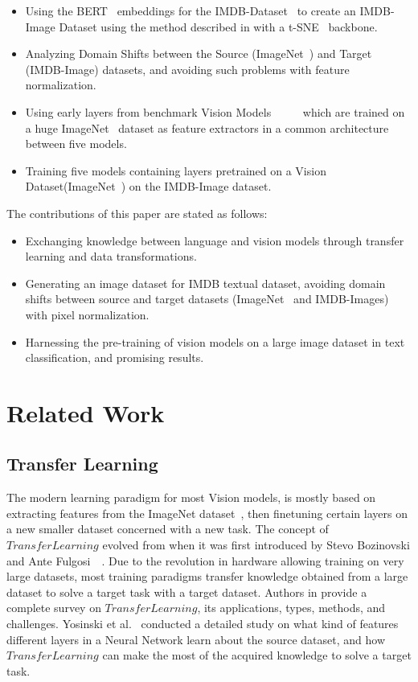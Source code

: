 \documentclass[conference]{IEEEtran}
\begin{document}
\begin{itemize}
    \item Using the BERT~\cite{Bert} embeddings for the IMDB-Dataset~\cite{imdb} to create
    an IMDB-Image Dataset using the method described in \cite{deepinsight} with a t-SNE~\cite{tsne} backbone. 
    \item Analyzing Domain Shifts between the Source (ImageNet~\cite{imagenet}) and Target (IMDB-Image) datasets, and avoiding such problems with feature normalization.
    \item Using early layers from benchmark Vision Models~\cite{alexnet}~\cite{shufflenetv2}~\cite{vgg16}~\cite{resnet}~\cite{resnext} which are trained on a huge ImageNet~\cite{imagenet} dataset as feature extractors in a common architecture between five models.
    \item Training five models containing layers pretrained on a Vision Dataset(ImageNet~\cite{imagenet}) on the IMDB-Image dataset.
\end{itemize}

The contributions of this paper are stated as follows:

\begin{itemize}
    \item Exchanging knowledge between language and vision models through transfer learning
        and data transformations.
    \item Generating an image dataset for IMDB textual dataset, avoiding domain shifts between source and target datasets (ImageNet~\cite{imagenet} and IMDB-Images) with pixel normalization.
    \item Harnessing the pre-training of vision models on a large image dataset in text classification, and promising results.
\end{itemize}

\section{Related Work}
\subsection{Transfer Learning}
 The modern learning paradigm for most Vision models, is mostly based on extracting features from the ImageNet dataset~\cite{imagenet}, then finetuning certain layers on a new smaller dataset concerned with a new task. The concept of $Transfer  Learning$ evolved from when it was first introduced by Stevo Bozinovski and Ante Fulgosi~\cite{transferlearning}~\cite{transferlearningreminder}. Due to the revolution in hardware allowing training on very large datasets, most training paradigms transfer knowledge obtained from a large dataset to solve a target task with a target dataset. Authors in \cite{compsurvey} provide a complete survey on $Transfer Learning$, its applications, types, methods, and challenges. Yosinski et al.~\cite{howtransferable} conducted a detailed study on what kind of features different layers in a Neural Network learn about the source dataset, and how $Transfer Learning$ can make the most of the acquired knowledge to solve a target task. 
\end{document}
